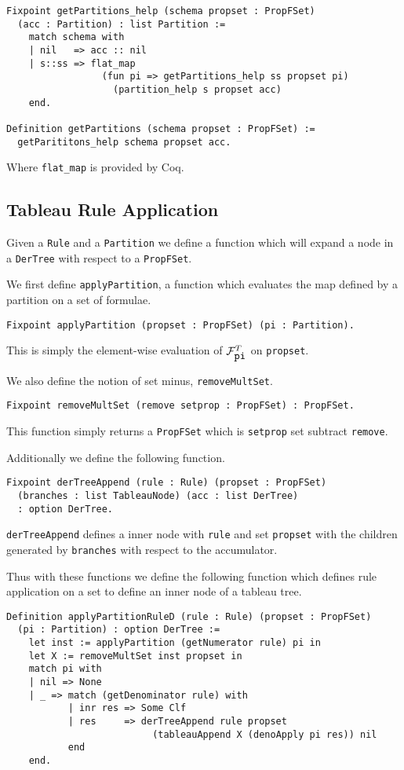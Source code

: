 \documentclass{llncs}
\begin{document}
\begin{verbatim}
Fixpoint getPartitions_help (schema propset : PropFSet)
  (acc : Partition) : list Partition :=
    match schema with
    | nil   => acc :: nil
    | s::ss => flat_map
                 (fun pi => getPartitions_help ss propset pi) 
                   (partition_help s propset acc)
    end.

Definition getPartitions (schema propset : PropFSet) :=
  getParititons_help schema propset acc.
\end{verbatim}

Where \verb+flat_map+ is provided by Coq.

\subsection{Tableau Rule Application}

Given a \verb+Rule+ and a \verb+Partition+ we define a function which will
expand a node in a \verb+DerTree+ with respect to a \verb+PropFSet+.

We first define \verb+applyPartition+, a function which evaluates the map
defined by a partition on a set of formulae.

\begin{verbatim}
Fixpoint applyPartition (propset : PropFSet) (pi : Partition).
\end{verbatim}

This is simply the element-wise evaluation of $\mathcal{F}_{\verb+pi+}^{T}$ on
\verb+propset+.

We also define the notion of set minus, \verb+removeMultSet+.

\begin{verbatim}
Fixpoint removeMultSet (remove setprop : PropFSet) : PropFSet.
\end{verbatim}

This function simply returns a \verb+PropFSet+ which is \verb+setprop+ set
subtract \verb+remove+.

Additionally we define the following function.

\begin{verbatim}
Fixpoint derTreeAppend (rule : Rule) (propset : PropFSet)
  (branches : list TableauNode) (acc : list DerTree)
  : option DerTree.
\end{verbatim}

\verb+derTreeAppend+ defines a inner node with \verb+rule+ and set
\verb+propset+ with the children generated by \verb+branches+ with respect to
the accumulator.

Thus with these functions we define the following function which defines rule
application on a set to define an inner node of a tableau tree.

\begin{verbatim}
Definition applyPartitionRuleD (rule : Rule) (propset : PropFSet)
  (pi : Partition) : option DerTree :=
    let inst := applyPartition (getNumerator rule) pi in
    let X := removeMultSet inst propset in
    match pi with
    | nil => None
    | _ => match (getDenominator rule) with
           | inr res => Some Clf
           | res     => derTreeAppend rule propset
                          (tableauAppend X (denoApply pi res)) nil
           end
    end.
\end{verbatim}
\end{document}
